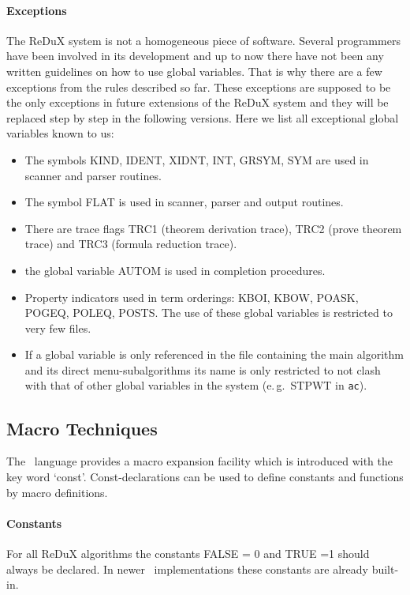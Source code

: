 \paragraph{Exceptions}
The ReDuX system is not a homogeneous piece of software.
Several programmers have been involved in its development and up to now there
have not been any written guidelines on how to use global variables.
That is why there are a few exceptions from the rules described so far.
These exceptions are supposed to be the only exceptions in future extensions of 
the ReDuX system and they will be replaced step by step in the following
versions.
Here we list all exceptional global variables known to us:
\begin{itemize}
 \item The symbols KIND, IDENT, XIDNT, INT, GRSYM, SYM are
  used in scanner and parser routines.
 \item The symbol FLAT is used in scanner, parser and output routines.
 \item There are trace flags TRC1 (theorem derivation trace), TRC2 (prove
  theorem trace) and TRC3 (formula reduction trace).
 \item the global variable AUTOM is used in completion procedures.
 \item Property indicators used in term orderings:
       KBOI, KBOW, POASK, POGEQ, POLEQ, POSTS. 
       The use of these global variables is restricted to very few files.
 \item If a global variable is only referenced in the file containing the
  main algorithm and its direct menu-subalgorithms
  its name is only restricted to not clash with that of
  other global variables in the system (e.\,g.\ STPWT in {\tt ac}).
\end{itemize}

\subsection{Macro Techniques} \label{ss:mac}

The \ALDES\ language provides a macro expansion facility which is introduced
with the key word `const'.
Const-declarations can be used to define constants and functions by macro
definitions.

\paragraph{Constants}
For all ReDuX algorithms the constants FALSE = 0 and TRUE =1 should always be
declared.
In newer \ALDES\ implementations these constants are already built-in.

